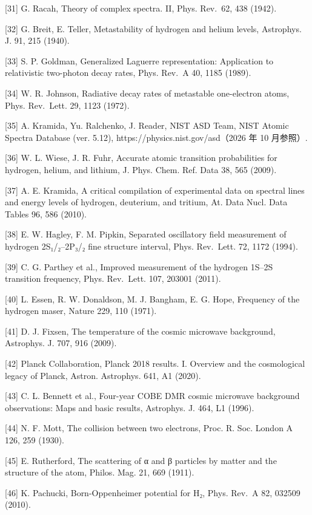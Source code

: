 \documentclass[
  a4paper,
]{ltjsarticle}
\begin{document}
{[}31{]} G. Racah, Theory of complex spectra. II, Phys. Rev.~62, 438
(1942).

{[}32{]} G. Breit, E. Teller, Metastability of hydrogen and helium
levels, Astrophys. J. 91, 215 (1940).

{[}33{]} S. P. Goldman, Generalized Laguerre representation: Application
to relativistic two-photon decay rates, Phys. Rev.~A 40, 1185 (1989).

{[}34{]} W. R. Johnson, Radiative decay rates of metastable one-electron
atoms, Phys. Rev.~Lett. 29, 1123 (1972).

{[}35{]} A. Kramida, Yu. Ralchenko, J. Reader, NIST ASD Team, NIST
Atomic Spectra Database (ver. 5.12), https://physics.nist.gov/asd（2026
年 10 月参照）.

{[}36{]} W. L. Wiese, J. R. Fuhr, Accurate atomic transition
probabilities for hydrogen, helium, and lithium, J. Phys. Chem. Ref.
Data 38, 565 (2009).

{[}37{]} A. E. Kramida, A critical compilation of experimental data on
spectral lines and energy levels of hydrogen, deuterium, and tritium,
At. Data Nucl. Data Tables 96, 586 (2010).

{[}38{]} E. W. Hagley, F. M. Pipkin, Separated oscillatory field
measurement of hydrogen 2S₁/₂--2P₃/₂ fine structure interval, Phys.
Rev.~Lett. 72, 1172 (1994).

{[}39{]} C. G. Parthey et al., Improved measurement of the hydrogen
1S--2S transition frequency, Phys. Rev.~Lett. 107, 203001 (2011).

{[}40{]} L. Essen, R. W. Donaldson, M. J. Bangham, E. G. Hope, Frequency
of the hydrogen maser, Nature 229, 110 (1971).

{[}41{]} D. J. Fixsen, The temperature of the cosmic microwave
background, Astrophys. J. 707, 916 (2009).

{[}42{]} Planck Collaboration, Planck 2018 results. I. Overview and the
cosmological legacy of Planck, Astron. Astrophys. 641, A1 (2020).

{[}43{]} C. L. Bennett et al., Four-year COBE DMR cosmic microwave
background observations: Maps and basic results, Astrophys. J. 464, L1
(1996).

{[}44{]} N. F. Mott, The collision between two electrons, Proc. R. Soc.
London A 126, 259 (1930).

{[}45{]} E. Rutherford, The scattering of α and β particles by matter
and the structure of the atom, Philos. Mag. 21, 669 (1911).

{[}46{]} K. Pachucki, Born-Oppenheimer potential for H₂, Phys. Rev.~A
82, 032509 (2010).
\end{document}
